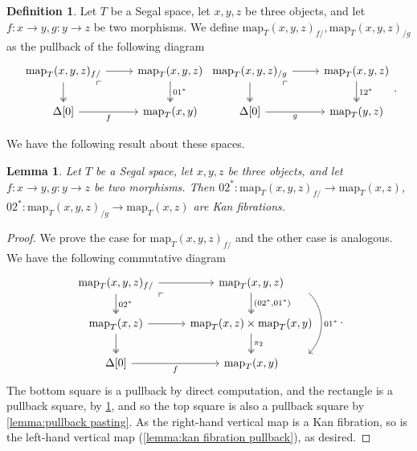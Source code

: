 \documentclass[11pt, a4paper]{amsart}
\newcommand{\map}{\mathrm{map}}
\newtheorem{lemma}[equation]{Lemma}
\theoremstyle{definition}
\newtheorem{definition}[equation]{Definition}
\theoremstyle{remark}
\numberwithin{equation}{section}
\begin{document}
\begin{definition} \label{def:map xyz f g}
  Let $T$ be a Segal space, let $x,y,z$ be three objects, and let $f\colon x \to y, g\colon y \to z$ be two morphisms. We define $\map_T(x,y,z)_{f/},\map_T(x,y,z)_{/g}$ as the pullback of the following diagram
 \[
  \begin{tikzcd}
  \map_T(x,y,z)_{f/} \arrow[r] \arrow[d, twoheadrightarrow] \arrow[dr, phantom, "\ulcorner", very near start] & \map_T(x,y,z) \arrow[d, "01^*", twoheadrightarrow] \\
  \Delta[0] \arrow[r, "{f}"'] & \map_T(x,y)
  \end{tikzcd}
  \begin{tikzcd}
  \map_T(x,y,z)_{/g} \arrow[r] \arrow[d, twoheadrightarrow] \arrow[dr, phantom, "\ulcorner", very near start] & \map_T(x,y,z) \arrow[d, "12^*", twoheadrightarrow] \\
  \Delta[0] \arrow[r, "g"'] & \map_T(y,z)
  \end{tikzcd}.
 \]
\end{definition}

We have the following result about these spaces.

\begin{lemma} \label{lemma:done kan fibration}
  Let $T$ be a Segal space, let $x,y,z$ be three objects, and let $f\colon x \to y, g\colon y \to z$ be two morphisms. Then $02^*\colon\map_T(x,y,z)_{f/} \to \map_T(x,z)$, $02^*\colon\map_T(x,y,z)_{/g} \to \map_T(x,z)$ are Kan fibrations.
\end{lemma}

\begin{proof}
  We prove the case for $\map_T(x,y,z)_{f/}$ and the other case is analogous. We have the following commutative diagram 
  \[
  \begin{tikzcd}
   \map_T(x,y,z)_{f/} \arrow[r] \arrow[d, "02^*", twoheadrightarrow] \arrow[dr, phantom, "\ulcorner", very near start] &  \map_T(x,y,z) \arrow[d, "{(02^*,01^*)}", twoheadrightarrow] \arrow[dd, bend left = 45, "01^*", shift left=1.5cm]\\
   \map_T(x,z) \arrow[r] \arrow[d, twoheadrightarrow] & \map_T(x,z) \times \map_T(x,y) \arrow[d, twoheadrightarrow, "\pi_2"] \\
   \Delta[0] \arrow[r, "{f}"'] & \map_T(x,y)
  \end{tikzcd}.
  \]
  The bottom square is a pullback by direct computation, and the rectangle is a pullback square, by \cref{def:map xyz f g}, and so the top square is also a pullback square by \cref{lemma:pullback pasting}. As the right-hand vertical map is a Kan fibration, so is the left-hand vertical map (\cref{lemma:kan fibration pullback}), as desired.
\end{proof}
\end{document}
